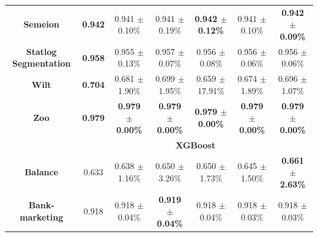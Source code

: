 \documentclass[iicol]{sn-jnl}
\theoremstyle{thmstyleone}%
\theoremstyle{thmstyletwo}%
\theoremstyle{thmstylethree}%
\begin{document}
\begin{table}
{\begin{tabular}{ccccccc}
\textbf{Semeion}                & {\color[HTML]{FE0000} \textbf{0.942}} & 0.941 $\pm$ 0.10\%                                 & 0.941 $\pm$ 0.19\%                                 & \textbf{0.942 $\pm$ 0.12\%}                        & 0.941 $\pm$ 0.10\%                                 & \textbf{0.942 $\pm$ 0.09\%}                        \\
\textbf{Statlog   Segmentation} & {\color[HTML]{FE0000} \textbf{0.958}} & 0.955 $\pm$ 0.13\%                                 & 0.957 $\pm$ 0.07\%                                 & 0.956 $\pm$ 0.08\%                                 & 0.956 $\pm$ 0.06\%                                 & 0.956 $\pm$ 0.06\%                                 \\
\textbf{Wilt}                   & {\color[HTML]{FE0000} \textbf{0.704}} & 0.681 $\pm$ 1.90\%                                 & 0.699 $\pm$ 1.95\%                                 & 0.659 $\pm$ 17.91\%                                & 0.674 $\pm$ 1.89\%                                 & 0.696 $\pm$ 1.07\%                                 \\
\textbf{Zoo}                    & {\color[HTML]{FE0000} \textbf{0.979}} & {\color[HTML]{FE0000} \textbf{0.979 $\pm$ 0.00\%}} & {\color[HTML]{FE0000} \textbf{0.979 $\pm$ 0.00\%}} & {\color[HTML]{FE0000} \textbf{0.979 $\pm$ 0.00\%}} & {\color[HTML]{FE0000} \textbf{0.979 $\pm$ 0.00\%}} & {\color[HTML]{FE0000} \textbf{0.979 $\pm$ 0.00\%}} \\ \hline
\textbf{}                       & \multicolumn{6}{c}{\textbf{XGBoost}}                                                                                                                                                                                                                                                       \\ \hline
\textbf{Balance}                & 0.633                                 & 0.638 $\pm$ 1.16\%                                 & 0.650 $\pm$ 3.26\%                                 & 0.650 $\pm$ 1.73\%                                 & 0.645 $\pm$ 1.50\%                                 & {\color[HTML]{FE0000} \textbf{0.661 $\pm$ 2.63\%}} \\
\textbf{Bank-marketing}         & 0.918                                 & 0.918 $\pm$ 0.04\%                                 & {\color[HTML]{FE0000} \textbf{0.919 $\pm$ 0.04\%}} & 0.918 $\pm$ 0.04\%                                 & 0.918 $\pm$ 0.03\%                                 & 0.918 $\pm$ 0.03\%                                 \\

\end{tabular}}
\end{table}
\end{document}
